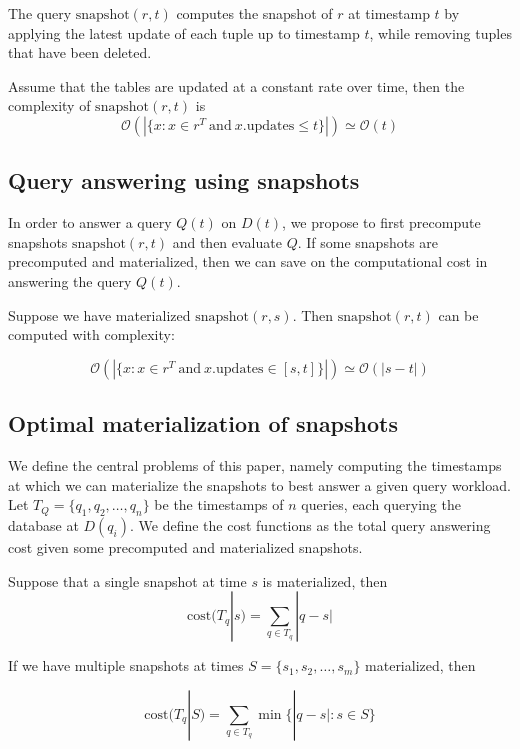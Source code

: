 \vspace{1em}

The query $\mathrm{snapshot}(r, t)$ computes the snapshot of $r$ at timestamp
$t$ by applying the latest update of each tuple up to timestamp $t$, while
removing tuples that have been deleted.

\begin{theorem}
    Assume that the tables are updated at a constant rate over time,
    then the complexity of $\mathrm{snapshot}(r, t)$ is 
    $$\mathcal{O}(|\{x: x\in r^T\mathrm{\ and\ } x.\mathrm{updates} \leq t\}|)
    \simeq \mathcal{O}(t)$$
\end{theorem}

\subsection{Query answering using snapshots}

In order to answer a query $Q(t)$ on $D(t)$, we propose to first precompute
snapshots $\mathrm{snapshot}(r, t)$ and then evaluate $Q$.  If some snapshots
are precomputed and materialized, then we can save on the computational cost in
answering the query $Q(t)$.

\begin{theorem}
    Suppose we have materialized $\mathrm{snapshot}(r, s)$.  Then
    $\mathrm{snapshot}(r, t)$ can be computed with complexity:

    $$\mathcal{O}(|\{x: x\in r^T\mathrm{\ and\ } x.\mathrm{updates} \in [s,
    t]\}|) \simeq \mathcal{O}(|s-t|)$$
\end{theorem}

\subsection{Optimal materialization of snapshots}

We define the central problems of this paper, namely computing the timestamps at
which we can materialize the snapshots to best answer a given query workload.
Let $T_Q = \{q_1, q_2, \dots, q_n\}$ be the timestamps of $n$ queries, each 
querying the database at $D(q_i)$.  We define the cost functions as the total
query answering cost given some precomputed and materialized snapshots.

\begin{definition}
    Suppose that a single snapshot at time $s$ is materialized, then
    $$\mathrm{cost}(T_q | s) = \sum_{q\in T_q} |q - s|$$

    If we have multiple snapshots at times $S=\{s_1, s_2, \dots, s_m\}$
    materialized, then

    $$\mathrm{cost}(T_q|S) = \sum_{q\in T_q} \min\{|q-s| : s\in S\}$$
\end{definition}

